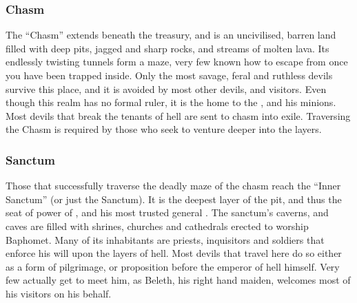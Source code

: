 \subsubsection{Chasm}
\label{sec:Chasm}

The ``Chasm'' extends beneath the treasury, and is an uncivilised, barren land
filled with deep pits, jagged and sharp rocks, and streams of molten lava. Its
endlessly twisting tunnels form a maze, very few known how to escape from once
you have been trapped inside. Only the most savage, feral and ruthless devils
survive this place, and it is avoided by most other devils, and visitors. Even
though this realm has no formal ruler, it is the home to the
, and his minions. Most devils that break the tenants
of hell are sent to chasm into exile. Traversing the Chasm is required by
those who seek to venture deeper into the layers.

\subsubsection{Sanctum}
\label{sec:Sanctum}

Those that successfully traverse the deadly maze of the chasm reach the
``Inner Sanctum'' (or just the Sanctum). It is the deepest layer of the pit,
and thus the seat of power of , and his most trusted
general . The sanctum's caverns, and caves are filled with
shrines, churches and cathedrals erected to worship Baphomet. Many of its
inhabitants are priests, inquisitors and soldiers that enforce his will upon
the layers of hell. Most devils that travel here do so either as a form of
pilgrimage, or proposition before the emperor of hell himself. Very few
actually get to meet him, as Beleth, his right hand maiden, welcomes most of
his visitors on his behalf.
